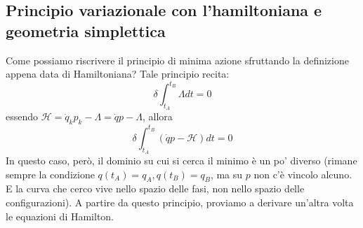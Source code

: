 \documentclass[a4paper,openany]{article}
\begin{document}
	\subsection{Principio variazionale con l'hamiltoniana e geometria simplettica}
	Come possiamo riscrivere il principio di minima azione sfruttando la definizione appena data di Hamiltoniana? Tale principio recita:
	\begin{equation}\label{key}
		\delta \int_{t_A}^{t_B} \Lambda dt = 0
	\end{equation}
	essendo $\mathcal{H} = \dot{q}_k p_k - \Lambda=\dot{q}p-\Lambda $, allora
	\begin{equation}\label{key}
		\delta \int_{t_A}^{t_B}(\dot{q} p-\mathcal{H}) dt = 0
	\end{equation}
	In questo caso, però, il dominio su cui si cerca il minimo è un po' diverso (rimane sempre la condizione $q(t_A)=q_A, q(t_B)=q_B$, ma su $p$ non c'è vincolo alcuno. E la curva che cerco vive nello spazio delle fasi, non nello spazio delle configurazioni). A partire da questo principio, proviamo a derivare un'altra volta le equazioni di Hamilton. 
	
\end{document}
